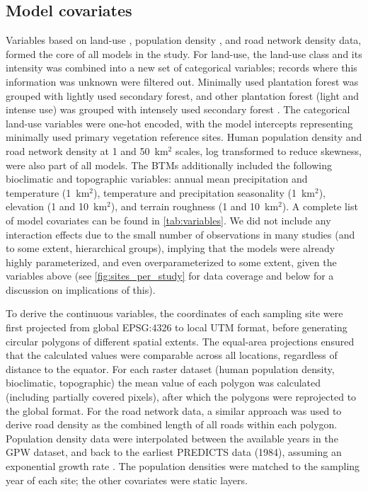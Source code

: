 
\subsection*{Model covariates}

Variables based on land-use \cite{hudson2017}, population density \cite{gpw2017}, and road network density \cite{groads2013} data, formed the core of all models in the study\cite{depalma2021}. For land-use, the land-use class and its intensity was combined into a new set of categorical variables; records where this information was unknown were filtered out. Minimally used plantation forest was grouped with lightly used secondary forest, and other plantation forest (light and intense use) was grouped with intensely used secondary forest \cite{depalma2021}. The categorical land-use variables were one-hot encoded, with the model intercepts representing minimally used primary vegetation reference sites. Human population density and road network density at 1 and 50~km$^2$ scales, log transformed to reduce skewness, were also part of all models. The BTMs additionally included the following bioclimatic and topographic variables: annual mean precipitation and temperature (1~km$^2$), temperature and precipitation seasonality (1~km$^2$), elevation (1 and 10~km$^2$), and terrain roughness (1 and 10~km$^2$). A complete list of model covariates can be found in \autoref{tab:variables}. We did not include any interaction effects due to the small number of observations in many studies (and to some extent, hierarchical groups), implying that the models were already highly parameterized, and even overparameterized to some extent, given the variables above (see \autoref{fig:sites_per_study} for data coverage and below for a discussion on implications of this).

To derive the continuous variables, the coordinates of each sampling site were first projected from global EPSG:4326 to local UTM format, before generating circular polygons of different spatial extents. The equal-area projections ensured that the calculated values were comparable across all locations, regardless of distance to the equator. For each raster dataset (human population density, bioclimatic, topographic) the mean value of each polygon was calculated (including partially covered pixels), after which the polygons were reprojected to the global format. For the road network data, a similar approach was used to derive road density as the combined length of all roads within each polygon. Population density data were interpolated between the available years in the GPW dataset, and back to the earliest PREDICTS data (1984), assuming an exponential growth rate \cite{goldewijk2005}. The population densities were matched to the sampling year of each site; the other covariates were static layers.

